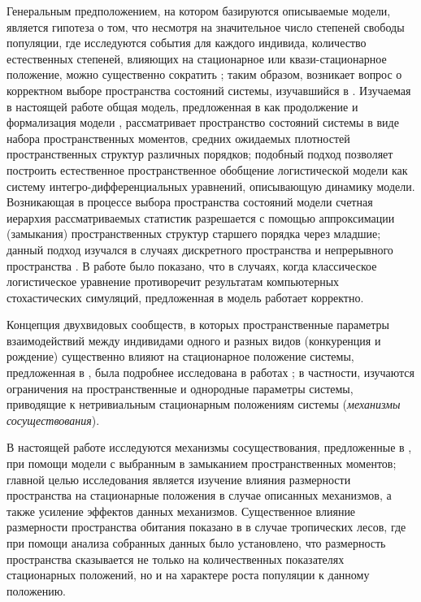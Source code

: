 Генеральным предположением, на котором базируются описываемые модели, является гипотеза о том, что несмотря на значительное число степеней свободы популяции, где исследуются события для каждого индивида, количество естественных степеней, влияющих на стационарное или квази-стационарное положение, можно существенно сократить \cite{RAND}; таким образом, возникает вопрос о корректном выборе пространства состояний системы, изучавшийся в \cite{WEINS1993,Hastings1994,Levin334}. Изучаемая в настоящей работе общая модель, предложенная в \cite{law_dieckmann_2000} как продолжение и формализация модели \cite{BOLKER1997179}, рассматривает пространство состояний системы в виде набора пространственных моментов, средних ожидаемых плотностей пространственных структур различных порядков; подобный подход позволяет построить естественное пространственное обобщение логистической модели \cite{ferh} как систему интегро-дифференциальных уравнений, описывающую динамику модели. Возникающая в процессе выбора пространства состояний модели счетная иерархия рассматриваемых статистик разрешается с помощью аппроксимации (замыкания) пространственных структур старшего порядка через младшие; данный подход изучался в случаях дискретного пространства  \cite{MATS,RAND1999,baalen_2000} и непрерывного пространства \cite{law_dieckmann_2000,Filipe200315}. В работе \cite{law_2003} было показано, что в случаях, когда классическое логистическое уравнение противоречит результатам компьютерных стохастических симуляций, предложенная в \cite{law_dieckmann_2000} модель работает корректно.

Концепция двухвидовых сообществ, в которых пространственные параметры взаимодействий между индивидами одного и разных видов (конкуренция и рождение) существенно влияют на стационарное положение системы, предложенная в \cite{law_2003}, была подробнее исследована в работах \cite{MURRELL,velazquez}; в частности, изучаются ограничения на пространственные и однородные параметры системы, приводящие к нетривиальным стационарным положениям системы (\textit{механизмы сосуществования}).

В настоящей работе исследуются механизмы сосуществования, предложенные в \cite{MURRELL}, при помощи модели \cite{law_dieckmann_2000} с выбранным в \cite{law_2003} замыканием пространственных моментов; главной целью исследования является изучение влияния размерности пространства на стационарные положения в случае описанных механизмов, а также усиление эффектов данных механизмов. Существенное влияние размерности пространства обитания показано в \cite{Pawar2012a} в случае тропических лесов, где при помощи анализа собранных данных было установлено, что размерность пространства сказывается не только на количественных показателях стационарных положений, но и на характере роста популяции к данному положению.

